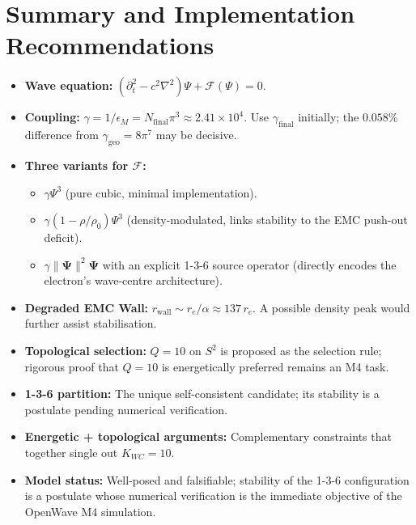 \documentclass[11pt,a4paper]{article}
\begin{document}
	\section{Summary and Implementation Recommendations}
	
	\begin{itemize}
		\item \textbf{Wave equation:}
		$(\partial_{t}^{2} - c^{2}\nabla^{2})\Psi + \mathcal{F}(\Psi) = 0$.
		\item \textbf{Coupling:}
		$\gamma = 1/\epsilon_{M} = N_{\text{final}}\pi^{3} \approx 2.41\times 10^{4}$.
		Use $\gamma_{\text{final}}$ initially; the $0.058\%$ difference
		from $\gamma_{\text{geo}} = 8\pi^{7}$ may be decisive.
		\item \textbf{Three variants for $\mathcal{F}$:}
		\begin{itemize}
			\item[A.] $\gamma\Psi^{3}$ (pure cubic, minimal implementation).
			\item[B.] $\gamma(1-\rho/\rho_{0})\Psi^{3}$ (density-modulated,
			links stability to the EMC push-out deficit).
			\item[C.] $\gamma\|\mathbf{\Psi}\|^{2}\mathbf{\Psi}$ with an
			explicit 1-3-6 source operator (directly encodes the
			electron's wave-centre architecture).
		\end{itemize}
		\item \textbf{Degraded EMC Wall:}
		$r_{\text{wall}} \sim r_e/\alpha \approx 137\,r_e$.  A possible
		density peak would further assist stabilisation.
		\item \textbf{Topological selection:}
		$Q=10$ on $S^{2}$ is proposed as the selection rule; rigorous
		proof that $Q=10$ is energetically preferred remains an M4 task.
		\item \textbf{1-3-6 partition:}
		The unique self-consistent candidate; its stability is a postulate
		pending numerical verification.
		\item \textbf{Energetic + topological arguments:}
		Complementary constraints that together single out $K_{WC}=10$.
		\item \textbf{Model status:}
		Well-posed and falsifiable; stability of the 1-3-6 configuration
		is a postulate whose numerical verification is the immediate
		objective of the OpenWave M4 simulation.
	\end{itemize}
	
\end{document}
